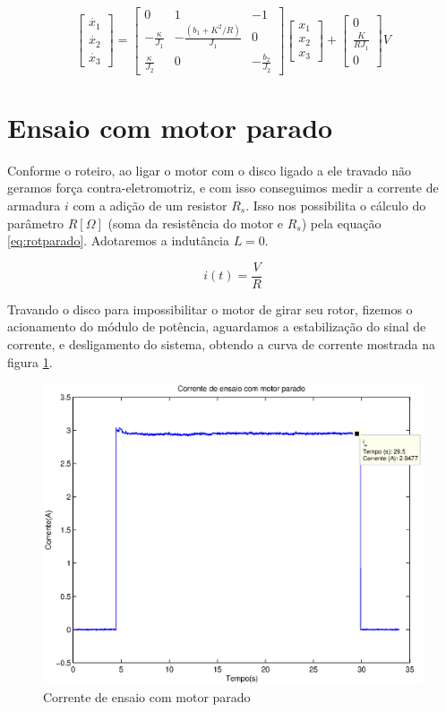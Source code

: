 \documentclass{article}
\begin{document}
\begin{equation}
\label{eq:ss}
\left[ \begin{array}{c}
\dot{x_1} \\
\dot{x_2} \\
\dot{x_3} \end{array} \right]
=
\left[ \begin{array}{ccc}
0 & 1 & -1 \\
-\frac{\kappa}{J_1} & -\frac{(b_1+K^2/R)}{J_1} & 0 \\
\frac{\kappa}{J_2} & 0 & -\frac{b_2}{J_2} \end{array} \right]
\left[ \begin{array}{c}
x_1 \\
x_2 \\
x_3  \end{array} \right]
+
\left[ \begin{array}{c}
0 				\\
\frac{K}{RJ_1} 	\\
0				\end{array} \right]
V
\end{equation}

\section{Ensaio com motor parado}
Conforme o roteiro\cite{bb:roteiro}, ao ligar o motor com o disco ligado a ele travado não geramos força contra-eletromotriz, e com isso conseguimos medir a corrente de armadura $i$ com a adição de um resistor $R_s$. Isso nos possibilita o cálculo do parâmetro $R [\Omega]$ (soma da resistência do motor e $R_s$) pela equação \ref{eq:rotparado}. Adotaremos a indutância $L=0$.

\begin{equation}
\label{eq:rotparado}
i(t) = \frac{V}{R}
\end{equation}

Travando o disco para impossibilitar o motor de girar seu rotor, fizemos o acionamento do módulo de potência, aguardamos a estabilização do sinal de corrente, e desligamento do sistema, obtendo a curva de corrente mostrada na figura \ref{fig:ensaiop}.

\begin{figure}[H]
	\centering
	\includegraphics[width=0.8\linewidth]{../ensaiop}
	\caption{Corrente de ensaio com motor parado}
	\label{fig:ensaiop}
\end{figure}
\end{document}
